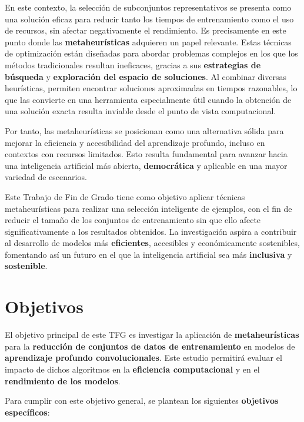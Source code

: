 En este contexto, la selección de subconjuntos representativos se presenta como una solución eficaz para reducir tanto
los tiempos de entrenamiento como el uso de recursos, sin afectar negativamente el rendimiento.
Es precisamente en este punto donde las \textbf{metaheurísticas} adquieren un papel relevante.
Estas técnicas de optimización están diseñadas para abordar problemas complejos en los que los métodos tradicionales
resultan ineficaces, gracias a sus \textbf{estrategias de búsqueda} y \textbf{exploración del espacio de soluciones}.
Al combinar diversas heurísticas, permiten encontrar soluciones aproximadas en tiempos razonables, lo que las convierte
en una herramienta especialmente útil cuando la obtención de una solución exacta resulta inviable desde el punto de
vista computacional.


Por tanto, las metaheurísticas se posicionan como una alternativa sólida para mejorar la eficiencia y accesibilidad del
aprendizaje profundo, incluso en contextos con recursos limitados.
Esto resulta fundamental para avanzar hacia una inteligencia artificial más abierta, \textbf{democrática} y aplicable
en una mayor variedad de escenarios.


Este Trabajo de Fin de Grado tiene como objetivo aplicar técnicas metaheurísticas para realizar una selección
inteligente de ejemplos, con el fin de reducir el tamaño de los conjuntos de entrenamiento sin que ello afecte
significativamente a los resultados obtenidos.
La investigación aspira a contribuir al desarrollo de modelos más \textbf{eficientes}, accesibles y económicamente
sostenibles, fomentando así un futuro en el que la inteligencia artificial sea más \textbf{inclusiva} y
\textbf{sostenible}.


\section{Objetivos}\label{sec:objetivos}
El objetivo principal de este TFG es investigar la aplicación de \textbf{metaheurísticas} para la
\textbf{reducción de conjuntos de datos de entrenamiento} en modelos de \textbf{aprendizaje profundo convolucionales}.
Este estudio permitirá evaluar el impacto de dichos algoritmos en la \textbf{eficiencia computacional} y en el
\textbf{rendimiento de los modelos}.


Para cumplir con este objetivo general, se plantean los siguientes \textbf{objetivos específicos}:

